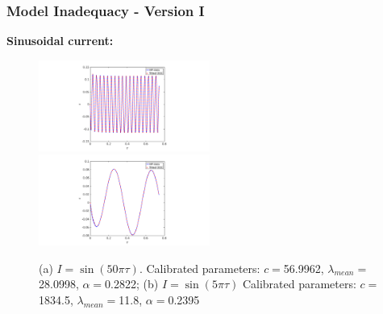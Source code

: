 \documentclass[10pt,xcolor=dvipsnames,compress]{beamer}
\begin{document}
\begin{frame}
\frametitle{Model Inadequacy - Version I}
\vfill

\textbf{Sinusoidal current:}

\begin{figure}[h]
    \centering
    \includegraphics[trim = 4.3in 0.2in 4.3in 0.2in, clip, width=0.5\textwidth]{figs/sin_error_w50pi.png} 
    ~
    \includegraphics[trim = 4.3in 0.2in 4.3in 0.2in, clip, width=0.5\textwidth]{figs/sin_error_w5pi.png} 
    \vspace{-4mm}
\caption{(a) $I = \sin (50\pi\tau)$. Calibrated parameters: $c =$56.9962, $\lambda_{mean}=$28.0998, $\alpha=$0.2822;
 (b) $I = \sin (5\pi\tau)$ Calibrated parameters: $c =$1834.5, $\lambda_{mean}=$11.8, $\alpha=$0.2395}
\end{figure}


\vfill
\end{frame}
\end{document}
